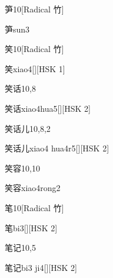 \begin{entry}{笋}{10}[Radical 竹]
  \begin{phonetics}{笋}{sun3}
  \end{phonetics}
\end{entry}

\begin{entry}{笑}{10}[Radical 竹]
  \begin{phonetics}{笑}{xiao4}[][HSK 1]
  \end{phonetics}
\end{entry}

\begin{entry}{笑话}{10,8}
  \begin{phonetics}{笑话}{xiao4hua5}[][HSK 2]
  \end{phonetics}
\end{entry}

\begin{entry}{笑话儿}{10,8,2}
  \begin{phonetics}{笑话儿}{xiao4 hua4r5}[][HSK 2]
  \end{phonetics}
\end{entry}

\begin{entry}{笑容}{10,10}
  \begin{phonetics}{笑容}{xiao4rong2}
  \end{phonetics}
\end{entry}

\begin{entry}{笔}{10}[Radical 竹]
  \begin{phonetics}{笔}{bi3}[][HSK 2]
  \end{phonetics}
\end{entry}

\begin{entry}{笔记}{10,5}
  \begin{phonetics}{笔记}{bi3 ji4}[][HSK 2]
  \end{phonetics}
\end{entry}

